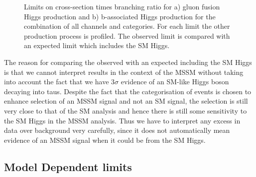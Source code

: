 \begin{figure}[tbh]
\caption{Limits on cross-section times branching ratio for a) gluon fusion Higgs
production and b) b-associated Higgs production for the combination of all
channels and categories. For each limit the other production process is
profiled. The observed limit is compared with an expected limit which includes
the \ac{SM} Higgs.}
\label{fig:mssmModelIndependent}
\end{figure}

The reason for comparing the observed with an expected including the \ac{SM} Higgs 
is that we cannot interpret results in the context of the \ac{MSSM} without taking into account
the fact that we have $3\sigma$ evidence of an \ac{SM}-like Higgs boson decaying
into taus. Despite the fact that the categorisation of events is chosen to
enhance selection of an \ac{MSSM} signal and not an \ac{SM} signal, the
selection is still very close to that of the \ac{SM} analysis and hence there is
still some sensitivity to the \ac{SM} Higgs in the \ac{MSSM} analysis. Thus we
have to interpret any excess in data over background very carefully, since it
does not automatically mean evidence of an \ac{MSSM} signal when it could be
from the \ac{SM} Higgs. 

\subsection{Model Dependent limits}
\label{sec:modeldependent}

